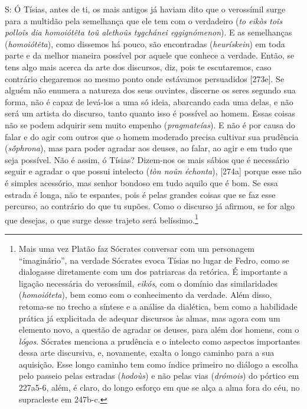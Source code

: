 S: Ó Tísias, antes de ti, os mais antigos já haviam dito que o
verossímil surge para a multidão pela semelhança que ele tem com o
verdadeiro (\emph{to eikòs toîs polloîs dia homoiótêta toû alethoûs
tygchánei eggignómenon}). E as semelhanças (\emph{homoiótêta}), como
dissemos há pouco, são encontradas (\emph{heurískein}) em toda parte e
da melhor maneira possível por aquele que conhece a verdade. Então, se
tens algo mais acerca da arte dos discursos, diz, pois te escutaremos,
caso contrário chegaremos ao mesmo ponto onde estávamos persuadidos
{[}273e{]}. Se alguém não enumera a natureza dos seus ouvintes, discerne
os seres segundo sua forma, não é capaz de levá-los a uma só ideia,
abarcando cada uma delas, e não será um artista do discurso, tanto
quanto isso é possível ao homem. Essas coisas não se podem adquirir sem
muito empenho (\emph{pragmateías}). E não é por causa do falar e do agir
com outros que o homem moderado precisa cultivar sua prudência
(\emph{sṓphrona}), mas para poder agradar aos deuses, ao falar, ao agir
e em tudo que seja possível. Não é assim, ó Tísias? Dizem-nos os mais
sábios que é necessário seguir e agradar o que possui intelecto
(\emph{tòn noûn échonta}), {[}274a{]} porque esse não é simples
acessório, mas senhor bondoso em tudo aquilo que é bom. Se essa estrada
é longa, não te espantes, pois é pelas grandes coisas que se faz esse
percurso, ao contrário do que tu supões. Como o discurso já afirmou, se
for algo que desejas, o que surge desse trajeto será
belíssimo.\footnote{Mais uma vez Platão faz Sócrates conversar com um
  personagem ``imaginário'', na verdade Sócrates evoca Tísias no lugar
  de Fedro, como se dialogasse diretamente com um dos patriarcas da
  retórica. É importante a ligação necessária do verossímil,
  \emph{eikós}, com o domínio das similaridades (\emph{homoióteta}), bem
  como com o conhecimento da verdade. Além disso, retoma-se no trecho a
  síntese e a análise da dialética, bem como a habilidade prática já
  explicitada de adequar discursos às almas, mas agora com um elemento
  novo, a questão de agradar os deuses, para além dos homens, com o
  \emph{lógos}. Sócrates menciona a prudência e o intelecto como
  aspectos importantes dessa arte discursiva, e, novamente, exalta o
  longo caminho para a sua aquisição. Esse longo caminho tem como índice
  primeiro no diálogo a escolha pelo passeio pelas estradas
  (\emph{hodoùs}) e não pelas vias (\emph{drómois}) do pórtico em
  227a5-6, além, é claro, do longo esforço em que se alça a alma fora do
  céu, no supracleste em 247b-c.}

